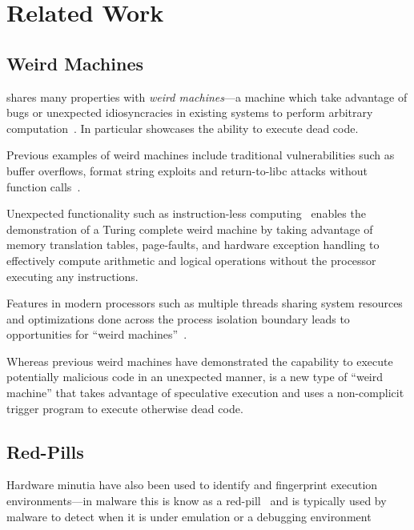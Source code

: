 \section{Related Work}
\label{sec:related-work}


\subsection{Weird Machines}

\speculake shares many properties with \textit{weird machines}---a machine which
take advantage of bugs or unexpected idiosyncracies in existing systems to
perform arbitrary
computation~\cite{weird_machines,bratus2011exploit}. In
particular \speculake showcases the ability to execute dead code.

Previous examples of weird machines include traditional vulnerabilities such as
buffer overflows, format string exploits and return-to-libc attacks without
function calls~\cite{buffer_overflow, format_string_exploit,
shacham2007geometry}. 

Unexpected functionality such as instruction-less
computing~\cite{bangert2013page} enables the demonstration of a Turing complete
weird machine by taking advantage of memory translation tables, page-faults, and
hardware exception handling to effectively compute arithmetic and logical
operations without the processor executing any instructions.

Features in modern processors such as multiple threads sharing system resources
and optimizations done across the process isolation boundary leads to
opportunities for ``weird machines''~\cite{d2015exploiting}.

Whereas previous weird machines have demonstrated the capability to execute
potentially malicious code in an unexpected manner, \speculake is a new type of
``weird machine'' that takes advantage of speculative execution and uses a
non-complicit trigger program to execute otherwise dead code.

\subsection{Red-Pills}
Hardware minutia have also been used to identify and fingerprint execution
environments---in malware this is know as a red-pill~\cite{red-pill} and is
typically used by malware to detect when it is under emulation or a debugging
environment~\cite{lindorfer2011detecting, balzarotti2010efficient,
paleari2009fistful}

